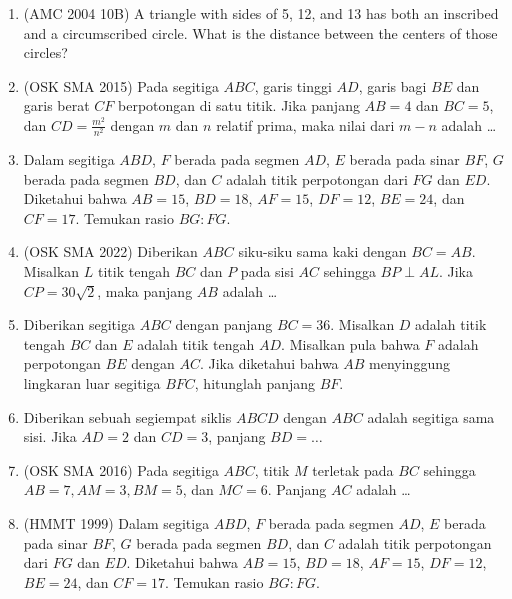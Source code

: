 \documentclass[12pt]{article}
\begin{document}
\begin{CJK*}{UTF8}{min}
\begin{enumerate}
    \item (AMC 2004 10B) A triangle with sides of 5, 12, and 13 has both an inscribed and a circumscribed circle. What is the distance between the centers of those circles?

    \item (OSK SMA 2015) Pada segitiga $ABC$, garis tinggi $AD$, garis bagi $BE$ dan garis berat $CF$ berpotongan di satu titik. Jika panjang $AB = 4$ dan $BC = 5$, dan $CD = \frac{m^2}{n^2}$ dengan $m$ dan $n$ relatif prima, maka nilai dari $m - n$ adalah \ldots

    \item Dalam segitiga $ABD$, $F$ berada pada segmen $AD$, $E$ berada pada sinar $BF$, $G$ berada pada segmen $BD$, dan $C$ adalah titik perpotongan dari $FG$ dan $ED$. Diketahui bahwa $AB = 15$, $BD = 18$, $AF = 15$, $DF = 12$, $BE = 24$, dan $CF = 17$. Temukan rasio $BG : FG$.

    \item (OSK SMA 2022) Diberikan $ABC$ siku-siku sama kaki dengan $BC=AB$. Misalkan $L$ titik tengah $BC$ dan $P$ pada sisi $AC$ sehingga $BP \perp AL$. Jika $CP=30\sqrt{2}$, maka panjang $AB$ adalah \ldots

    \item Diberikan segitiga $ABC$ dengan panjang $BC = 36$. Misalkan $D$ adalah titik tengah $BC$ dan $E$ adalah titik tengah $AD$. Misalkan pula bahwa $F$ adalah perpotongan $BE$ dengan $AC$. Jika diketahui bahwa $AB$ menyinggung lingkaran luar segitiga $BFC$, hitunglah panjang $BF$.

    \item Diberikan sebuah segiempat siklis $ABCD$ dengan $ABC$ adalah segitiga sama sisi. Jika $AD=2$ dan $CD=3$, panjang $BD=\dots$

    \item (OSK SMA 2016) Pada segitiga $ABC$, titik $M$ terletak pada $BC$ sehingga $AB=7, AM=3, BM=5$, dan $MC=6$. Panjang $AC$ adalah \dots

    \item (HMMT 1999) Dalam segitiga $ABD$, $F$ berada pada segmen $AD$, $E$ berada pada sinar $BF$, $G$ berada pada segmen $BD$, dan $C$ adalah titik perpotongan dari $FG$ dan $ED$. Diketahui bahwa $AB = 15$, $BD = 18$, $AF = 15$, $DF = 12$, $BE = 24$, dan $CF = 17$. Temukan rasio $BG : FG$.


\end{enumerate}
\end{CJK*}
\end{document}
